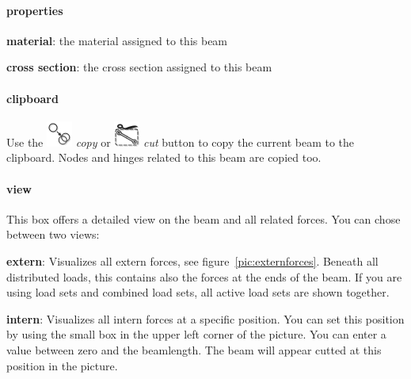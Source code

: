 \documentclass[a4paper,11pt]{report}
\begin{document}
\paragraph{properties}
\begin{trivlist}
	\leftskip=1cm
	\item[]\textbf{material}: the material assigned to this beam
	\item[]\textbf{cross section}: the cross section assigned to this beam
\end{trivlist}

\paragraph{clipboard}
Use the \includegraphics[scale=0.5]{../../icons/copy.png} \textit{copy} or \includegraphics[scale=0.5]{../../icons/cut.png} \textit{cut} button to copy the current beam to the clipboard. Nodes and hinges related to this beam are copied too.

\paragraph{view}

This box offers a detailed view on the beam and all related forces. You can chose between two views: 

\begin{trivlist}
\leftskip=1cm
\item[] \textbf{extern}: Visualizes all extern forces, see figure~\ref{pic:externforces}. Beneath all distributed loads, this contains also the forces at the ends of the beam. If you are using load sets and combined load sets, all active load sets are shown together. 
\item[] \textbf{intern}: Visualizes all intern forces at a specific position. You can set this position by using the small box in the upper left corner of the picture. You can enter a value between zero and the beamlength. The beam will appear cutted at this position in the picture.
\end{trivlist}
\end{document}
